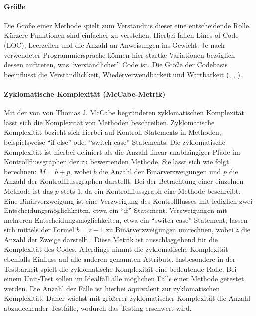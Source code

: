 \documentclass[a4paper, 12pt]{article}
\begin{document}
\paragraph{Größe}
Die Größe einer Methode spielt zum Verständnis dieser eine entscheidende Rolle. Kürzere Funktionen sind einfacher zu verstehen. 
Hierbei fallen Lines of Code (LOC), Leerzeilen und die Anzahl an Anweisungen ins Gewicht. 
Je nach verwendeter Programmiersprache können hier startke Variationen bezüglich dessen auftreten, was \enquote{verständlicher} Code ist. Die Größe der Codebasis beeinflusst die Verständlichkeit, Wiederverwendbarkeit und Wartbarkeit (\textcite{Kim_software_implementation}, \textcite{Lorenz_object_oriented_software_metrics}, \textcite{Linda_softwarequality}).

\paragraph{Zyklomatische Komplexität (McCabe-Metrik)}
Mit der von von Thomas J. McCabe begründeten zyklomatischen Komplexität lässt sich die Komplexität von Methoden beschreiben. 
Zyklomatische Komplexität bezieht sich hierbei auf Kontroll-Statements in Methoden, beispielsweise \enquote{if-else} oder \enquote{switch-case}-Statements.
Die zyklomatische Komplexität ist hierbei definiert als die Anzahl linear unabhängiger Pfade im Kontrollflussgraphen der zu bewertenden Methode. 
Sie lässt sich wie folgt berechnen: $M = b + p$, wobei $b$ die Anzahl der Binärverzweigungen und $p$ die Anzahl der Kontrollflussgraphen darstellt.
Bei der Betrachtung einer einzelnen Methode ist das $p$ stets 1, da ein Kontrollflussgraph eine Methode beschreibt.
Eine Binärverzweigung ist eine Verzweigung des Kontrollflusses mit lediglich zwei Entscheidungsmöglichkeiten, etwa ein \enquote{if}-Statement.
Verzweigungen mit mehreren Entscheidungsmöglichkeiten, etwa ein \enquote{switch-case}-Statement, lassen sich mittels der Formel $b = z - 1$ zu Binärverzweigungen umrechnen,  wobei $z$ die Anzahl der Zweige darstellt \parencite{McCabe_complexity}.
Diese Metrik ist ausschlaggebend für die Komplexität des Codes.
Allerdings nimmt die zyklomatische Komplexität ebenfalls Einfluss auf alle anderen genannten Attribute.
Insbesondere in der Testbarkeit spielt die zyklomatische Komplexität eine bedeutende Rolle.
Bei einem Unit-Test sollen im Idealfall alle möglichen Fälle einer Methode getestet werden.
Die Anzahl der Fälle ist hierbei äquivalent zur zyklomatischen Komplexität.
Daher wächst mit größerer zyklomatischer Komplexität die Anzahl abzudeckender Testfälle, wodurch das Testing erschwert wird.
\end{document}
